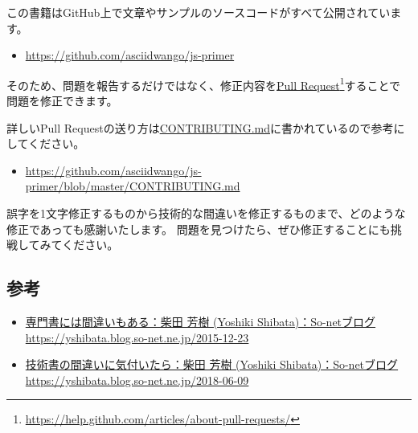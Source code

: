 この書籍はGitHub上で文章やサンプルのソースコードがすべて公開されています。

\begin{itemize}
\item
  \url{https://github.com/asciidwango/js-primer}
\end{itemize}

そのため、問題を報告するだけではなく、修正内容を\href{https://help.github.com/articles/about-pull-requests/}{Pull
Request}\footnote{\url{https://help.github.com/articles/about-pull-requests/}}することで問題を修正できます。

詳しいPull
Requestの送り方は\href{https://github.com/asciidwango/js-primer/blob/master/CONTRIBUTING.md}{CONTRIBUTING.md}に書かれているので参考にしてください。

\begin{itemize}
\item
  \url{https://github.com/asciidwango/js-primer/blob/master/CONTRIBUTING.md}
\end{itemize}

誤字を1文字修正するものから技術的な間違いを修正するものまで、どのような修正であっても感謝いたします。
問題を見つけたら、ぜひ修正することにも挑戦してみてください。

\hypertarget{reference}{%
\subsection*{参考}\label{reference}}

\begin{itemize}
\item
  \href{https://yshibata.blog.so-net.ne.jp/2015-12-23}{専門書には間違いもある：柴田
  芳樹 (Yoshiki Shibata)：So-netブログ}\\ \url{https://yshibata.blog.so-net.ne.jp/2015-12-23}
\item
  \href{https://yshibata.blog.so-net.ne.jp/2018-06-09}{技術書の間違いに気付いたら：柴田
  芳樹 (Yoshiki Shibata)：So-netブログ}\\ \url{https://yshibata.blog.so-net.ne.jp/2018-06-09}
\end{itemize}
